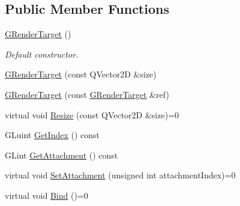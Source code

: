 \subsection*{Public Member Functions}
\begin{DoxyCompactItemize}
\item 
\mbox{\label{class_geometry_engine_1_1_geometry_buffer_1_1_g_render_target_adcb56737d39537303e082e262af8207a}} 
\mbox{\hyperlink{class_geometry_engine_1_1_geometry_buffer_1_1_g_render_target_adcb56737d39537303e082e262af8207a}{G\+Render\+Target}} ()
\begin{DoxyCompactList}\small\item\em Default constructor. \end{DoxyCompactList}\item 
\mbox{\hyperlink{class_geometry_engine_1_1_geometry_buffer_1_1_g_render_target_a8f9dc8c82ec5f21b7386e30073bed483}{G\+Render\+Target}} (const Q\+Vector2D \&size)
\item 
\mbox{\hyperlink{class_geometry_engine_1_1_geometry_buffer_1_1_g_render_target_a26d555dc583ad6ae0c545f26db97274d}{G\+Render\+Target}} (const \mbox{\hyperlink{class_geometry_engine_1_1_geometry_buffer_1_1_g_render_target}{G\+Render\+Target}} \&ref)
\item 
virtual void \mbox{\hyperlink{class_geometry_engine_1_1_geometry_buffer_1_1_g_render_target_ac1e54f456408b53de44fe10116d649dd}{Resize}} (const Q\+Vector2D \&size)=0
\item 
G\+Luint \mbox{\hyperlink{class_geometry_engine_1_1_geometry_buffer_1_1_g_render_target_a68bde2ce731945e3f5668001403b1fed}{Get\+Index}} () const
\item 
G\+Lint \mbox{\hyperlink{class_geometry_engine_1_1_geometry_buffer_1_1_g_render_target_a42f43fba3fb8fe32e81509b5869c87e2}{Get\+Attachment}} () const
\item 
virtual void \mbox{\hyperlink{class_geometry_engine_1_1_geometry_buffer_1_1_g_render_target_a1031c44ad374654e2183d3b1b99638a3}{Set\+Attachment}} (unsigned int attachment\+Index)=0
\item 
\mbox{\label{class_geometry_engine_1_1_geometry_buffer_1_1_g_render_target_a45c743235386bb57c3bbf12ed49b1410}} 
virtual void \mbox{\hyperlink{class_geometry_engine_1_1_geometry_buffer_1_1_g_render_target_a45c743235386bb57c3bbf12ed49b1410}{Bind}} ()=0

\end{DoxyCompactItemize}
